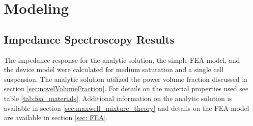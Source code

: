 


\clearpage

\FloatBarrier

\section{Modeling}

\subsection{Impedance Spectroscopy Results}

\par The impedance response for the analytic solution, the simple FEA model, and the device model were calculated for medium saturation and a single cell suspension. The analytic solution utilized the power volume fraction discussed in section \ref{sec:novelVolumeFraction}. For details on the material properties used see table \ref{tab:fea_materials}. Additional information on the analytic solution is available in section \ref{sec:maxwell_mixture_theory} and details on the FEA model are available in section \ref{sec: FEA}. 

